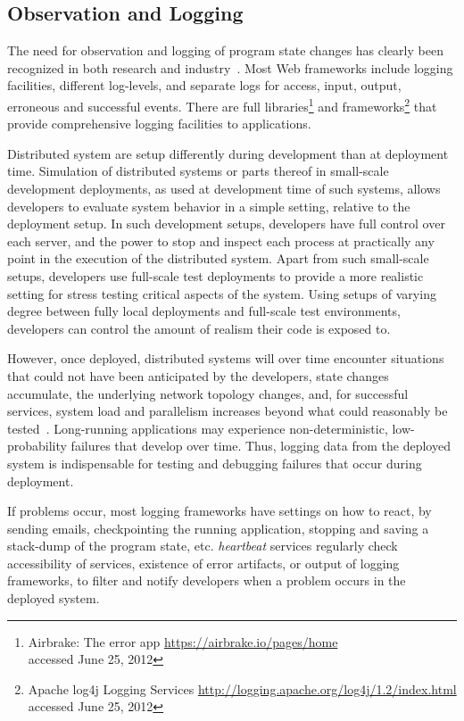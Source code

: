 \subsection{Observation and Logging}
\label{sec:observation-logging}

The need for observation and logging of program state changes has
clearly been recognized in both research and
industry~\cite{Saito2005,altekar2009odr,Stanley2009}. Most Web
frameworks include logging facilities, different log-levels, and
separate logs for access, input, output, erroneous and successful
events. There are full libraries\footnote{Airbrake: The error app 
  \url{https://airbrake.io/pages/home}\\
  accessed June 25, 2012} and frameworks\footnote{Apache log4j
  Logging Services
  \url{http://logging.apache.org/log4j/1.2/index.html}\\
  accessed June 25, 2012}
that provide comprehensive logging facilities to applications.

Distributed system are setup differently during development than at
deployment time. Simulation of distributed systems or parts thereof in
small-scale development deployments, as used at development time of
such systems, allows developers to evaluate system behavior in a
simple setting, relative to the deployment setup. In such development
setups, developers have full control over each server, and the power
to stop and inspect each process at practically any point in the
execution of the distributed system. Apart from such small-scale
setups, developers use full-scale test deployments to provide a more
realistic setting for stress testing critical aspects of the
system. Using setups of varying degree between fully local deployments
and full-scale test environments, developers can control the amount of
realism their code is exposed to.

However, once deployed, distributed systems will over time encounter
situations that could not have been anticipated by the developers,
state changes accumulate, the underlying network topology changes,
and, for successful services, system load and parallelism increases
beyond what could reasonably be
tested~\cite{Geels2006Replay}. Long-running applications may
experience non-deterministic, low-probability failures that develop
over time. Thus, logging data from the deployed system is
indispensable for testing and debugging failures that occur during
deployment.

If problems occur, most logging frameworks have settings on how to
react, by sending emails, checkpointing the running application,
stopping and saving a stack-dump of the program state,
etc. \emph{heartbeat} services regularly check accessibility of
services, existence of error artifacts, or output of logging
frameworks, to filter and notify developers when a problem occurs in
the deployed system.


